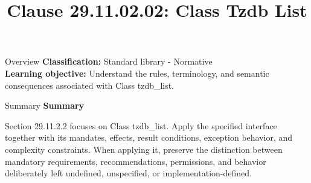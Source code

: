 \documentclass[10pt,letterpaper]{article}
\title{Clause 29.11.02.02: Class Tzdb List}
\author{}
\date{}
\begin{document}
\maketitle
\begin{CornellOverviewBox}{Overview}
\textbf{Classification:} Standard library - Normative\\[2pt]
\textbf{Learning objective:} Understand the rules, terminology, and semantic consequences associated with Class tzdb\_list.
\end{CornellOverviewBox}\begin{CornellSummaryBox}{Summary}
{\sffamily\bfseries\color{Accent} Summary}\par\vspace{3pt}Section 29.11.2.2 focuses on Class tzdb\_list. Apply the specified interface together with its mandates, effects, result conditions, exception behavior, and complexity constraints. When applying it, preserve the distinction between mandatory requirements, recommendations, permissions, and behavior deliberately left undefined, unspecified, or implementation-defined.
\end{CornellSummaryBox}
\end{document}
